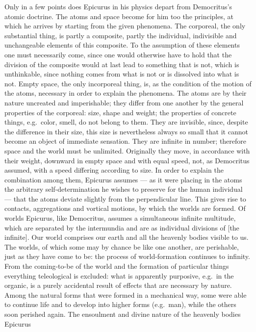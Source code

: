 Only in a few points does Epicurus in his physics depart from
Democritus's atomic doctrine. The atoms and space become for him too
the principles, at which he arrives by starting from the given
phenomena. The corporeal, the only substantial thing, is partly a
composite, partly the individual, indivisible and unchangeable elements
of this composite. To the assumption of these elements one must
necessarily come, since one would otherwise have to hold
that the division of the composite would at last lead to
something that is not, which is unthinkable, since nothing comes from
what is not or is dissolved into what is not. Empty space, the only
incorporeal thing, is, as the condition of the motion of the atoms,
necessary in order to explain the phenomena. The atoms are by their
nature uncreated and imperishable; they differ from one another by the
general properties of the corporeal: size, shape and weight; the
properties of concrete things, e.g.\ color, smell, do not belong to
them. They are invisible, since, despite the difference in their size,
this size is nevertheless always so small that it cannot become an
object of immediate sensation. They are infinite in number; therefore
space and the world must be unlimited. Originally they move, in
accordance with their weight, downward in empty space and with equal
speed, not, as Democritus assumed, with a speed differing according to
size. In order to explain the combination among them, Epicurus assumes
--- as it were placing in the atoms the arbitrary self-determination he
wishes to preserve for the human individual --- that the atoms deviate
slightly from the perpendicular line. This gives rise to contacts,
aggregations and vortical motions, by which the worlds are formed. Of
worlds Epicurus, like Democritus, assumes a simultaneous infinite
multitude, which are separated by the intermundia and are as individual
divisions of  [the infinite]. Our world comprises our
earth and all the heavenly bodies visible to us. The worlds, of which
some may by chance be like one another, are perishable, just as they
have come to be: the process of world-formation continues to infinity.
From the coming-to-be of the world and the formation of particular
things everything teleological is excluded: what is apparently
purposive, e.g.\ in the organic, is a purely accidental result of
effects that are necessary by nature. Among the natural forms that were
formed in a mechanical way, some were able to continue life and to
develop into higher forms (e.g.\ man), while the others soon perished
again. The ensoulment and divine nature of the heavenly bodies Epicurus
